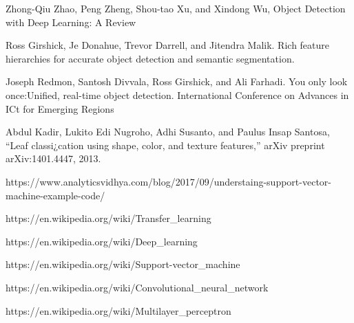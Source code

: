 \begin{thebibliography}{99}
Zhong-Qiu Zhao, Peng Zheng, Shou-tao Xu, and Xindong Wu, Object Detection with Deep Learning: A Review

Ross Girshick, Je Donahue, Trevor Darrell, and Jitendra Malik. Rich feature hierarchies for accurate object detection and semantic segmentation.

Joseph Redmon, Santosh Divvala, Ross Girshick, and Ali Farhadi. You only look once:Unified, real-time object detection. International Conference on Advances in ICt for Emerging Regions

Abdul Kadir, Lukito Edi Nugroho, Adhi Susanto, and Paulus Insap
Santosa, “Leaf classi¿cation using shape, color, and texture features,”
arXiv preprint arXiv:1401.4447, 2013.

https://www.analyticsvidhya.com/blog/2017/09/understaing-support-vector- machine-example-code/

https://en.wikipedia.org/wiki/Transfer\_learning

https://en.wikipedia.org/wiki/Deep\_learning

https://en.wikipedia.org/wiki/Support-vector\_machine

https://en.wikipedia.org/wiki/Convolutional\_neural\_network

https://en.wikipedia.org/wiki/Multilayer\_perceptron

\end{thebibliography}



\clearpage










%